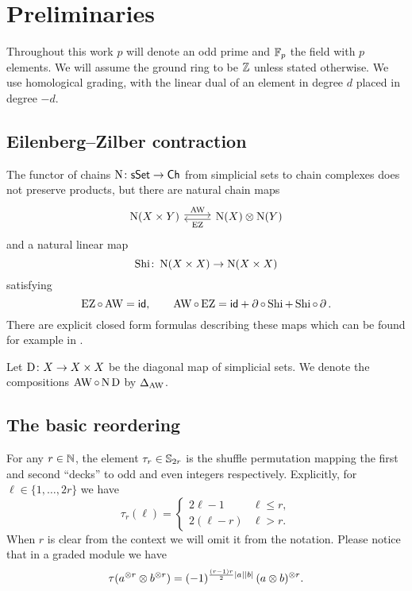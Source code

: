 
\section{Preliminaries}

Throughout this work $p$ will denote an odd prime and ${\mathbb{F}_p}$ the field with $p$ elements.
We will assume the ground ring to be $\mathbb{Z}$ unless stated otherwise.
We use homological grading, with the linear dual of an element in degree $d$ placed in degree $-d$.

\subsection{Eilenberg--Zilber contraction}

The functor of chains $\operatorname{N} \colon \mathsf{sSet} \to \mathsf{Ch}$ from simplicial sets to chain complexes does not preserve products, but there are natural chain maps
\[
\begin{tikzcd}
	\chains(X \times Y) \arrow[r,shift left=2pt,"\AW"] &
	\chains(X) \ot \chains(Y) \arrow[l,shift left=2pt,"\EZ"]
\end{tikzcd}
\]
and a natural linear map
\[
\operatorname{Shi} \colon \operatorname{N}(X \times X) \to \operatorname{N}(X \times X)
\]
satisfying
\[
\operatorname{EZ} \circ \operatorname{AW} = \mathsf{id}, \qquad
\operatorname{AW} \circ \operatorname{EZ} = \mathsf{id} + \operatorname{\partial} \circ \operatorname{Shi} + \operatorname{Shi} \circ \operatorname{\partial}.
\]
There are explicit closed form formulas describing these maps which can be found for example in \cite[56]{real2000homological}.

Let $\mathrm{D} \colon X \to X \times X$ be the diagonal map of simplicial sets.
We denote the compositions $\operatorname{AW} \circ \operatorname{N}\mathrm{D}$ by $\Delta_{\operatorname{AW}}$.

\subsection{The basic reordering}\label{ss:reordering}

For any $r\in\mathbb{N}$, the element $\tau_r \in \mathbb{S}_{2r}$ is the shuffle permutation mapping the first and second ``decks'' to odd and even integers respectively.
Explicitly, for $\ell \in \{1,\dots,2r\}$ we have
\begin{equation*}
	\tau_r(\ell) =
	\begin{cases}
		2\ell-1 & \ell \leq r, \\
		2(\ell-r) & \ell > r.
	\end{cases}
\end{equation*}
When $r$ is clear from the context we will omit it from the notation.
Please notice that in a graded module we have
\[
\tau(a^{\otimes r} \otimes b^{\otimes r}) =
(-1)^{\frac{(r-1)r}{2}\lvert a\rvert\lvert b\rvert} \, (a \otimes b)^{\otimes r}.
\]